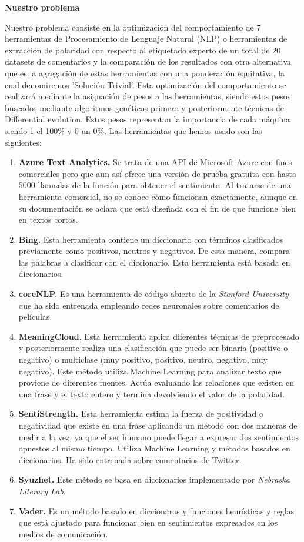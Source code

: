 \documentclass{article}
\begin{document}
\newpage
\textbf{Nuestro problema}

Nuestro problema consiste en la optimización del comportamiento de 7 herramientas de Procesamiento de Lenguaje Natural (NLP) o herramientas de extracción de polaridad con respecto al etiquetado experto de un total de 20 datasets de comentarios y la comparación de los resultados con otra alternativa que es la agregación de estas herramientas con una ponderación equitativa, la cual denomiremos 'Solución Trivial'. Esta optimización del comportamiento se realizará mediante la asignación de pesos a las herramientas, siendo estos pesos buscados mediante algoritmos genéticos primero y posteriormente técnicas de Differential evolution. Estos pesos representan la importancia de cada máquina siendo 1 el 100\% y 0 un 0\%. Las herramientas que hemos usado son las siguientes:
\begin{enumerate}
	\item \textbf{Azure Text Analytics. } Se trata de una API de Microsoft Azure con fines comerciales pero que aun así ofrece una versión de prueba gratuita con hasta 5000 llamadas de la función para obtener el sentimiento. Al tratarse de una herramienta comercial, no se conoce cómo funcionan exactamente, aunque en su documentación se aclara que está diseñada con el fin de que funcione bien en textos cortos.
	\item \textbf{Bing. } Esta herramienta contiene un diccionario con términos
	clasificados previamente como positivos, neutros y negativos. De esta
	manera, compara las palabras a clasificar con el diccionario. Esta
	herramienta está basada en diccionarios. 
	\item \textbf{coreNLP. } Es una herramienta de código abierto de la \textit{Stanford University} que ha sido entrenada empleando redes neuronales sobre comentarios de películas.
	\item \textbf{MeaningCloud}. Esta herramienta aplica diferentes técnicas de
	preprocesado y posteriormente realiza una clasificación que puede ser
	binaria (positivo o negativo) o multiclase (muy positivo, positivo, neutro,
	negativo, muy negativo). Este método utiliza Machine Learning
	para analizar texto que proviene de diferentes fuentes. Actúa evaluando
	las relaciones que existen en una frase y el texto entero y termina
	devolviendo el valor de la polaridad.
	\item \textbf{SentiStrength. }Esta herramienta estima la fuerza de positividad
	o negatividad que existe en una frase aplicando un método con dos
	maneras de medir a la vez, ya que el ser humano puede llegar a expresar
	dos sentimientos opuestos al mismo tiempo. Utiliza Machine Learning
	y métodos basados en diccionarios. Ha sido entrenada sobre comentarios de Twitter.
	\item \textbf{Syuzhet. } Este método se basa en diccionarios implementado por \textit{Nebraska Literary Lab}.
	\item \textbf{Vader. } Es un método basado en diccionaros y funciones heurísticas y reglas que está ajustado para funcionar bien en sentimientos expresados en los medios de comunicación.
\end{enumerate}
\end{document}
